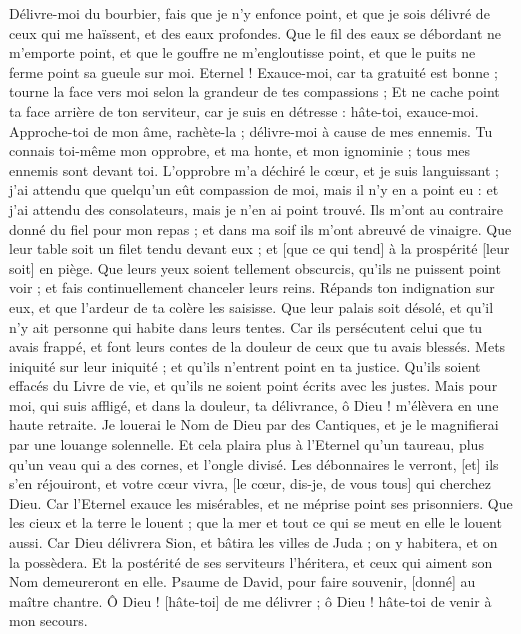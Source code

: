 \begin{multicols}{2}
Délivre-moi du bourbier, fais que je n'y enfonce point, et que je sois délivré de ceux qui me haïssent, et des eaux profondes.
Que le fil des eaux se débordant ne m'emporte point, et que le gouffre ne m'engloutisse point, et que le puits ne ferme point sa gueule sur moi.
Eternel ! Exauce-moi, car ta gratuité est bonne ; tourne la face vers moi selon la grandeur de tes compassions ;
Et ne cache point ta face arrière de ton serviteur, car je suis en détresse : hâte-toi, exauce-moi.
Approche-toi de mon âme, rachète-la ; délivre-moi à cause de mes ennemis.
Tu connais toi-même mon opprobre, et ma honte, et mon ignominie ; tous mes ennemis sont devant toi.
L'opprobre m'a déchiré le cœur, et je suis languissant ; j'ai attendu que quelqu'un eût compassion de moi, mais il n'y en a point eu : et j'ai attendu des consolateurs, mais je n'en ai point trouvé.
Ils m'ont au contraire donné du fiel pour mon repas ; et dans ma soif ils m'ont abreuvé de vinaigre.
Que leur table soit un filet tendu devant eux ; et [que ce qui tend] à la prospérité [leur soit] en piège.
Que leurs yeux soient tellement obscurcis, qu'ils ne puissent point voir ; et fais continuellement chanceler leurs reins.
Répands ton indignation sur eux, et que l'ardeur de ta colère les saisisse.
Que leur palais soit désolé, et qu'il n'y ait personne qui habite dans leurs tentes.
Car ils persécutent celui que tu avais frappé, et font leurs contes de la douleur de ceux que tu avais blessés.
Mets iniquité sur leur iniquité ; et qu'ils n'entrent point en ta justice.
Qu'ils soient effacés du Livre de vie, et qu'ils ne soient point écrits avec les justes.
Mais pour moi, qui suis affligé, et dans la douleur, ta délivrance, ô Dieu ! m'élèvera en une haute retraite.
Je louerai le Nom de Dieu par des Cantiques, et je le magnifierai par une louange solennelle.
Et cela plaira plus à l'Eternel qu'un taureau, plus qu'un veau qui a des cornes, et l'ongle divisé.
Les débonnaires le verront, [et] ils s'en réjouiront, et votre cœur vivra, [le cœur, dis-je, de vous tous] qui cherchez Dieu.
Car l'Eternel exauce les misérables, et ne méprise point ses prisonniers.
Que les cieux et la terre le louent ; que la mer et tout ce qui se meut en elle le louent aussi.
Car Dieu délivrera Sion, et bâtira les villes de Juda ; on y habitera, et on la possèdera.
Et la postérité de ses serviteurs l'héritera, et ceux qui aiment son Nom demeureront en elle.
\VerseOne{}Psaume de David, pour faire souvenir, [donné] au maître chantre. Ô Dieu ! [hâte-toi] de me délivrer ; ô Dieu ! hâte-toi de venir à mon secours.

\end{multicols}

